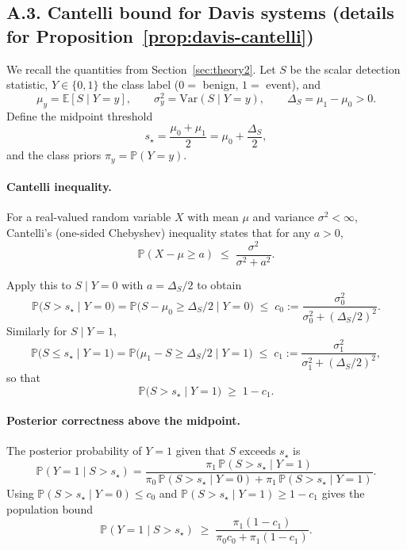 \documentclass[11pt]{article}
\theoremstyle{remark}
\theoremstyle{plain}
\begin{document}
\subsection*{A.3. Cantelli bound for Davis systems (details for Proposition~\ref{prop:davis-cantelli})}

We recall the quantities from Section~\ref{sec:theory2}. Let $S$ be the scalar detection statistic,
$Y\in\{0,1\}$ the class label ($0=$ benign, $1=$ event), and
\[
\mu_y = \mathbb{E}[S\mid Y=y],\qquad
\sigma_y^2 = \mathrm{Var}(S\mid Y=y),
\qquad
\Delta_S = \mu_1 - \mu_0 > 0.
\]
Define the midpoint threshold
\[
s_\star = \frac{\mu_0 + \mu_1}{2} = \mu_0 + \frac{\Delta_S}{2},
\]
and the class priors $\pi_y = \mathbb{P}(Y=y)$.

\paragraph{Cantelli inequality.}
For a real-valued random variable $X$ with mean $\mu$ and variance $\sigma^2<\infty$, Cantelli’s
(one-sided Chebyshev) inequality states that for any $a>0$,
\[
\mathbb{P}(X-\mu \ge a)
\;\le\;
\frac{\sigma^2}{\sigma^2 + a^2}.
\]

Apply this to $S\mid Y=0$ with $a=\Delta_S/2$ to obtain
\[
\mathbb{P}\bigl(S > s_\star \mid Y=0\bigr)
=
\mathbb{P}\bigl(S-\mu_0 \ge \Delta_S/2 \mid Y=0\bigr)
\;\le\;
c_0
:=
\frac{\sigma_0^2}{\sigma_0^2 + (\Delta_S/2)^2}.
\]
Similarly for $S\mid Y=1$,
\[
\mathbb{P}\bigl(S \le s_\star \mid Y=1\bigr)
=
\mathbb{P}\bigl(\mu_1 - S \ge \Delta_S/2 \mid Y=1\bigr)
\;\le\;
c_1
:=
\frac{\sigma_1^2}{\sigma_1^2 + (\Delta_S/2)^2},
\]
so that
\[
\mathbb{P}\bigl(S > s_\star \mid Y=1\bigr)
\;\ge\;
1-c_1.
\]

\paragraph{Posterior correctness above the midpoint.}
The posterior probability of $Y=1$ given that $S$ exceeds $s_\star$ is
\[
\mathbb{P}(Y=1 \mid S> s_\star)
=
\frac{\pi_1\,\mathbb{P}(S> s_\star\mid Y=1)}
     {\pi_0\,\mathbb{P}(S> s_\star\mid Y=0) + \pi_1\,\mathbb{P}(S> s_\star\mid Y=1)}.
\]
Using $\mathbb{P}(S> s_\star\mid Y=0)\le c_0$ and
$\mathbb{P}(S> s_\star\mid Y=1)\ge 1-c_1$ gives the population bound
\begin{equation}
\mathbb{P}(Y=1 \mid S> s_\star)
\;\ge\;
\frac{\pi_1(1-c_1)}{\pi_0 c_0 + \pi_1(1-c_1)}.
\label{eq:posterior-cantelli-pop}
\end{equation}
\end{document}
